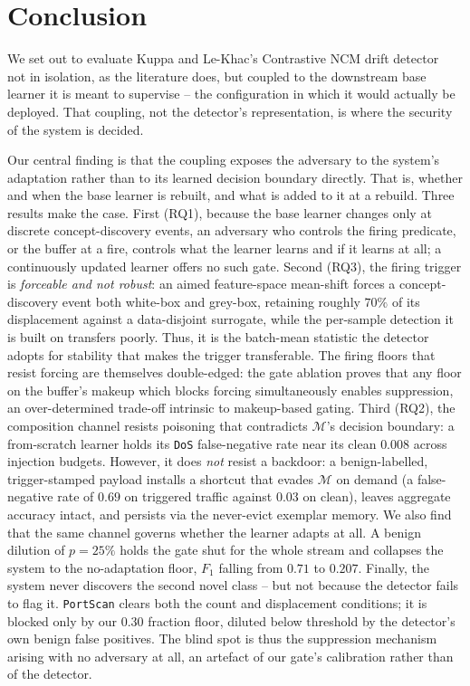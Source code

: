 \chapter{Conclusion}
\label{ch:conclusion}

We set out to evaluate Kuppa and Le-Khac's Contrastive NCM drift detector~\cite{Kuppa_2022} not in isolation, as the literature does, but coupled to the downstream base learner it is meant to supervise -- the configuration in which it would actually be deployed. That coupling, not the detector's representation, is where the security of the system is decided.

Our central finding is that the coupling exposes the adversary to the system's adaptation rather than to its learned decision boundary directly. That is, whether and when the base learner is rebuilt, and what is added to it at a rebuild. Three results make the case. First (RQ1), because the base learner changes only at discrete concept-discovery events, an adversary who controls the firing predicate, or the buffer at a fire, controls what the learner learns and if it learns at all; a continuously updated learner offers no such gate. Second (RQ3), the firing trigger is \emph{forceable and not robust}: an aimed feature-space mean-shift forces a concept-discovery event both white-box and grey-box, retaining roughly $70\%$ of its displacement against a data-disjoint surrogate, while the per-sample detection it is built on transfers poorly. Thus, it is the batch-mean statistic the detector adopts for stability that makes the trigger transferable. The firing floors that resist forcing are themselves double-edged: the gate ablation proves that any floor on the buffer's makeup which blocks forcing simultaneously enables suppression, an over-determined trade-off intrinsic to makeup-based gating. Third (RQ2), the composition channel resists poisoning that contradicts $\mathcal{M}$'s decision boundary: a from-scratch learner holds its \texttt{DoS} false-negative rate near its clean $0.008$ across injection budgets. However, it does \emph{not} resist a backdoor: a benign-labelled, trigger-stamped payload installs a shortcut that evades $\mathcal{M}$ on demand (a false-negative rate of $0.69$ on triggered traffic against $0.03$ on clean), leaves aggregate accuracy intact, and persists via the never-evict exemplar memory. We also find that the same channel governs whether the learner adapts at all. A benign dilution of $p = 25\%$ holds the gate shut for the whole stream and collapses the system to the no-adaptation floor, $F_1$ falling from $0.71$ to $0.207$. Finally, the system never discovers the second novel class -- but not because the detector fails to flag it. \texttt{PortScan} clears both the count and displacement conditions; it is blocked only by our $0.30$ fraction floor, diluted below threshold by the detector's own benign false positives. The blind spot is thus the suppression mechanism arising with no adversary at all, an artefact of our gate's calibration rather than of the detector.

